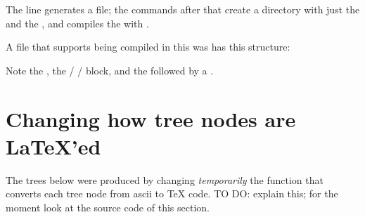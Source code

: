 \documentclass[oneside]{article}
\def\msk{\medskip}
\begin{document}
\msk

The line  generates a 
file; the commands after that create a directory with just the
 and the , and compiles the  with
.

A  file that supports being compiled in this was has this
structure:

\msk

%
%
{\pu\foo}

\msk

Note the , the \co{\\ifluatex} /
\co{\\else} / \co{\\fi} block, and the 
followed by a \co{\\pu}.








%                                                 

\section{Changing how tree nodes are \LaTeX'ed}

The trees below were produced by changing {\sl temporarily} the
function that converts each tree node from ascii to \TeX{} code. TO
DO: explain this; for the moment look at the source code of this
section.

\end{document}

